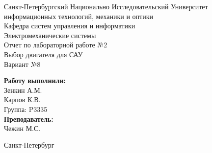 \begin{titlepage}	%

	\begin{center}		%

		\large Санкт-Петербургский Национально Исследовательский Университет\\
		\large информационных технологий, механики и оптики \\
		\large Кафедра систем управления и информатики\\[6cm]
		
		\huge Электромеханические системы\\[0.5cm] %
		\large Отчет по лабораторной работе №2\\[0.1cm]
		\large Выбор двигателя для САУ\\[0.5cm]
		\large Вариант №8\\[5cm]

	\end{center}


	\begin{flushright} %
		\begin{minipage}{0.25\textwidth} %
			\begin{flushleft} %

				\large\textbf{Работу выполнили:}\\
				\large Зенкин А.М.\\
				\large Карпов К.В.\\
				\large {Группа:} P3335\\
				
				\large \textbf{Преподаватель:}\\
				\large Чежин М.С.

			\end{flushleft}
		\end{minipage}
	\end{flushright}
	
	\vfill %

	\begin{center}
	\large Санкт-Петербург\\
	\large \the\year %
	\end{center} %

\thispagestyle{empty} %
\end{titlepage} %

\vfill %
